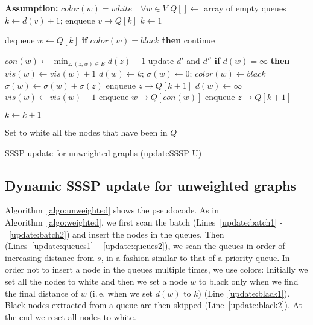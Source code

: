 \documentclass[english]{llncs}
\newcommand{\ie}{i.\,e.\xspace}
\begin{document}
\begin{algorithm}[H]
\begin{footnotesize}
\LinesNumbered
\textbf{Assumption:} $color(w)=white\quad \forall w \in V$\;
$Q[]\leftarrow$ array of empty queues\;
{\label{update:batch1}
	$k \leftarrow d(v)+1$; enqueue $v \rightarrow Q[k]$\;
}\label{update:batch2}
$k \leftarrow 1$\; \label{update:queues1}
{\label{lst2:line:start2}
	{
		dequeue $w\leftarrow Q[k]$\;
		\textbf{if} $color(w)=black$ \textbf{then}			continue\; \label{update:black2}
	
		$con(w) \leftarrow \min_{z : (z,w)\in E} d(z) + 1$\;
		{\label{update:if}
			update $d'$ and $d''$\;
			\textbf{if} $d(w) = \infty$  \textbf{then}   $vis(w) \leftarrow vis(w)+1$\; \label{update:vis}
			$d(w) \leftarrow k$; $\sigma(w)\leftarrow 0$; $color(w) \leftarrow black$\; \label{update:black1}
			{
				{\label{update:sp}
					$\sigma(w)\leftarrow \sigma(w)+\sigma(z)$\;
				}\label{update:sp2}
				{\label{update:neigh1}
					enqueue $z \rightarrow Q[k+1]$\;
				}\label{update:neigh2}
			}
		}\label{update:if2}
		\Else
		{\label{update:else}
			{
				$d(w)\leftarrow \infty$\;
				$vis(w) \leftarrow vis(w)-1$\; \label{update:vis3}
				{
					enqueue $w \rightarrow Q[con(w)]$\;
					{
						{
							enqueue $z \rightarrow Q[k+1]$\;
						}
					}
				}
			}
		}\label{update:else2}
	}
	$k\leftarrow k+1$\;
}\label{update:queues2}
Set to white all the nodes that have been in $Q$\;
\end{footnotesize}
\caption{SSSP update for unweighted graphs (\textsf{updateSSSP-U})}
\label{algo:unweighted}
\end{algorithm}
\subsection{Dynamic SSSP update for unweighted graphs}
Algorithm~\ref{algo:unweighted} shows the pseudocode. As in Algorithm~\ref{algo:weighted}, we
first scan the batch (Lines~\ref{update:batch1} -~\ref{update:batch2}) and insert the nodes
in the queues. Then (Lines~\ref{update:queues1} -~\ref{update:queues2}), we scan the queues in order of increasing distance from $s$, in a fashion similar to that of a priority queue. 
In order not to insert a node in the queues multiple times, we use colors: Initially we set all the nodes to white and then we set a node $w$ to black only when we find the final distance of $w$ (\ie when we set $d(w)$ to $k$) (Line~\ref{update:black1}). Black nodes extracted from a queue are then skipped (Line~\ref{update:black2}). At the end we reset all nodes to white.
\end{document}
